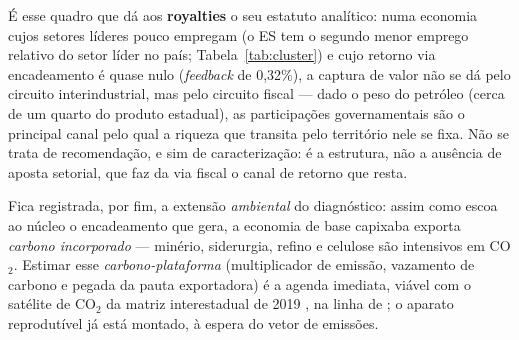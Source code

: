 \documentclass[11pt,a4paper]{article}
\begin{document}
É esse quadro que dá aos
\textbf{royalties} o seu estatuto analítico: numa economia cujos setores líderes pouco
empregam (o ES tem o segundo menor emprego relativo do setor líder no país;
Tabela~\ref{tab:cluster})
e cujo retorno via encadeamento é quase nulo (\emph{feedback} de 0,32\%), a captura de
valor não se dá pelo circuito interindustrial, mas pelo circuito fiscal --- dado o peso do
petróleo (cerca de um quarto do produto estadual), as participações governamentais são o
principal canal pelo qual a riqueza que transita pelo território nele se fixa. Não se
trata de recomendação, e sim de caracterização: é a estrutura, não a ausência de aposta
setorial, que faz da via fiscal o canal de retorno que resta.

Fica registrada, por fim, a extensão \emph{ambiental} do diagnóstico: assim como escoa ao
núcleo o encadeamento que gera, a economia de base capixaba exporta \emph{carbono incorporado}
--- minério, siderurgia, refino e celulose são intensivos em CO$_2$. Estimar esse
\emph{carbono-plataforma} (multiplicador de emissão, vazamento de carbono e pegada da pauta
exportadora) é a agenda imediata, viável com o satélite de CO$_2$ da matriz interestadual de
2019 \citep{haddad2025matriz}, na linha de \citet{carvalho2009avaliacao}; o aparato
reprodutível já está montado, à espera do vetor de emissões.

\end{document}
